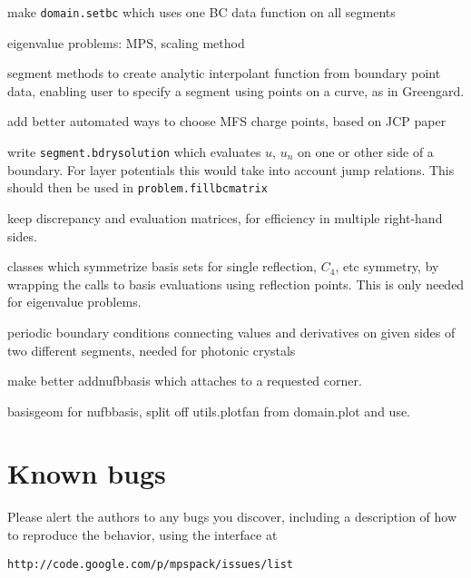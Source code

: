 \documentclass[12pt]{article}
\begin{document}
\item make {\tt domain.setbc} which uses one BC data function on all segments
\item eigenvalue problems: MPS, scaling method
\item segment methods to create analytic interpolant function from boundary
point data, enabling user to specify a segment using points on a curve,
as in Greengard.
\item add better automated ways to choose MFS charge points, based on JCP paper
\item write {\tt segment.bdrysolution} which evaluates $u$, $u_n$ on one
or other side of a boundary. For layer potentials this would take into account
jump relations. This should then be used in {\tt problem.fillbcmatrix}
\item keep discrepancy and evaluation matrices, for efficiency in multiple
right-hand sides.
\item classes which symmetrize basis sets for single reflection, $C_4$, etc
symmetry, by wrapping the calls to basis evaluations using reflection
points. This is only needed for eigenvalue problems.
\item periodic boundary conditions connecting values and derivatives
on given sides of two different segments, needed for photonic crystals
\item make better addnufbbasis which attaches to a requested corner.
\item basisgeom for nufbbasis, split off utils.plotfan from domain.plot and
use.
\ei

\section{Known bugs}

Please alert the authors to any bugs you discover, including a description
of how to reproduce the behavior, using the interface at

{\tt http://code.google.com/p/mpspack/issues/list}

 

\end{document}
